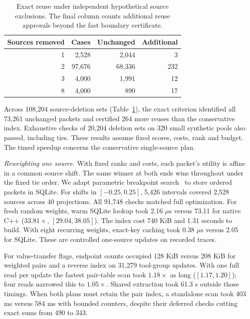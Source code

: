 \documentclass[conference]{IEEEtran}
\begin{document}
\balance
\begin{table}[t]
\caption{Exact reuse under independent hypothetical source exclusions. The final column counts additional reuse approvals beyond the fast boundary certificate.}
\centering\small
\begin{tabular}{rrrr}\toprule
Sources removed & Cases & Unchanged & Additional\\\midrule
1 & 2,528 & 2,044 & 3\\
2 & 97,676 & 68,336 & 232\\
3 & 4,000 & 1,991 & 12\\
8 & 4,000 & 890 & 17\\
\bottomrule\end{tabular}
\label{tab:exclusions}
\end{table}

Across 108,204 source-deletion sets (Table~\ref{tab:exclusions}), the exact criterion identified all 73,261 unchanged packets and certified 264 more reuses than the conservative index. Exhaustive checks of 20,204 deletion sets on 320 small synthetic pools also passed, including ties. These results assume fixed scores, costs, rank and budget. The timed speedup concerns the conservative single-source plan.

\noindent\textit{Reweighting one source.} With fixed ranks and costs, each packet's utility is affine in a common source shift. The same winner at both ends wins throughout under the fixed tie order. We adapt parametric breakpoint search~\cite{eisner} to store ordered packets in SQLite. For shifts in $[-0.25,0.25]$, 5,426 intervals covered 2,528 sources across 40 projections. All 91,748 checks matched full optimization. For fresh random weights, warm SQLite lookup took 2.16 $\mu$s versus 73.11 for native C++ ($33.81\times$, $[29.04,38.05]$). The index cost 740 KiB and 1.31 seconds to build. With eight recurring weights, exact-key caching took 0.38 $\mu$s versus 2.05 for SQLite. These are controlled one-source updates on recorded traces.

For value-transfer flags, endpoint counts occupied 128 KiB versus 208 KiB for weighted pairs and a reverse index on 31,279 tool-group updates. With one full read per update the fastest pair-table scan took $1.18\times$ as long ($[1.17,1.20]$); four reads narrowed this to $1.05\times$. Shared extraction took 61.3 s outside those timings. When both plans must retain the pair index, a standalone scan took 403 ms versus 584 ms with bounded counters, despite their deferred checks cutting exact sums from 490 to 343.
\end{document}
